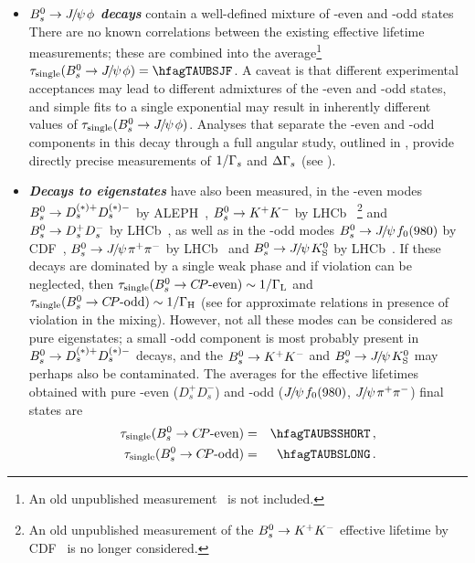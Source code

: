\begin{itemize}
\item
{\bf\em 
{\boldmath $B^0_s \to {J\mskip -3mu/\mskip -2mu\psi\mskip 2mu}\phi$ \unboldmath}decays}
contain a well-defined mixture of \CP-even and \CP-odd states
There are no known correlations
between the existing 
\particle{\Bs\to \jpsi\phi}
effective lifetime measurements; these are combined  
into the average\footnote{
An old unpublished measurement~\cite{CDFnote8524:2007,*CDFnote8524:2007_cont} is not included.}
$\tau_{\rm single}(\Bs\to \jpsi \phi) = \hfagTAUBSJF$. %
A caveat is that different experimental acceptances
may lead to different admixtures of the 
\CP-even and \CP-odd states, and simple fits to a single
exponential may result in inherently different 
values of $\tau_{\rm single}(B^0_s\to {J\mskip -3mu/\mskip -2mu\psi\mskip 2mu} \phi)$.
Analyses that separate the \CP-even and \CP-odd components in
this decay through a full angular study, outlined in ,
provide directly precise measurements of $1/\Gamma_{s}$ and $\Delta\Gamma_{s}$ (see ).

\item
{\bf\em Decays to \boldmath\CP eigenstates} have also 
been measured, in the \CP-even modes 
$B^0_s \to D_s^{(*)+}D_s^{(*)-}$ by ALEPH~\cite{Barate:2000kd},
$B^0_s \to K^+ K^-$ by LHCb~\cite{Aaij:2011kn,Aaij:2014fia,*Aaij:2012ns_cont}%
\footnote{An old unpublished measurement of the $B^0_s \to K^+ K^-$
effective lifetime by CDF~\cite{Tonelli:2006np} is no longer considered.}
and $B^0_s \to D_s^+D_s^-$ by LHCb~\cite{Aaij:2013bvd}, as well as in the \CP-odd modes 
$B^0_s \to {J\mskip -3mu/\mskip -2mu\psi\mskip 2mu} f_0(980)$ by CDF~\cite{Aaltonen:2011nk}, 
$B^0_s \to {J\mskip -3mu/\mskip -2mu\psi\mskip 2mu} \pi^+\pi^-$ by LHCb~\cite{Aaij:2013oba,*LHCb:2011aa_mod,*LHCb:2012ad_mod,*LHCb:2011ab_mod,*Aaij:2012nta_mod}
and $B^0_s \to {J\mskip -3mu/\mskip -2mu\psi\mskip 2mu} K^0_{\rm S}$ by LHCb~\cite{Aaij:2013eia}.
If these 
decays are dominated by a single weak phase and if \CP violation 
can be neglected, then $\tau_{\rm single}(\Bs \to \mbox{\CP-even}) \sim 1/\Gamma_{\rm L}$ 
and  $\tau_{\rm single}(\Bs \to \mbox{\CP-odd}) \sim 1/\Gamma_{\rm H}$ 
(see  for approximate relations in presence of
\CP violation in the mixing). 
However, not all these modes can be considered as pure \CP eigenstates; 
a small \CP-odd component is most probably present
in $B^0_s \to D_s^{(*)+}D_s^{(*)-}$ decays, and the $B^0_s \to K^+ K^-$
and $B^0_s \to {J\mskip -3mu/\mskip -2mu\psi\mskip 2mu} K^0_{\rm S}$ may perhaps also be contaminated. 
The averages for the effective lifetimes obtained with pure \CP-even 
($D_s^+D_s^-$) and \CP-odd (${J\mskip -3mu/\mskip -2mu\psi\mskip 2mu} f_0(980)$, ${J\mskip -3mu/\mskip -2mu\psi\mskip 2mu} \pi^+\pi^-$)
final states are
\begin{eqnarray}
\tau_{\rm single}(\Bs \to \mbox{\CP-even}) & = & \hfagTAUBSSHORT \,,
\labe{tau_KK}
\\
\tau_{\rm single}(\Bs \to \mbox{\CP-odd}) & = & \hfagTAUBSLONG \,.
\labe{tau_Jpsif0}
\end{eqnarray}

\end{itemize}

